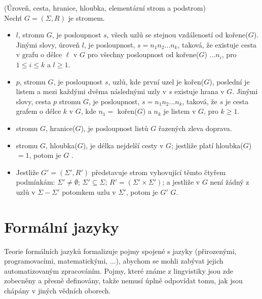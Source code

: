 \begin{defn}
  (Úroveň, cesta, hranice, hloubka, elementární strom a podstrom)\\
  Nechť $G = (\Sigma, R)$ je stromem.
  \begin{itemize}
    \item {} $l$, stromu $G$, je posloupnost $s$,
      všech uzlů se stejnou vzdáleností od kořene($G$).
      Jinými slovy, úroveň $l$, je posloupnost, $s = n_1 n_2 ... n_k$,
      taková, že existuje cesta v grafu o délce $\ell$ v $G$
      pro všechny posloupnost od kořene($G$)
      $ ... n_i$, pro $1 \leq i \leq k$ a $l \geq 1$.

    \item {} $p$, stromu $G$, je posloupnost $s$, uzlů,
      kde první uzel je kořen($G$), poslední je listem a mezi každými
      dvěma následnými uzly v $s$ existuje hrana v $G$.
      Jinými slovy, cesta $p$ stromu $G$, je posloupnost,
      $s = n_1 n_2 ... n_k$, taková, že $s$ je cesta grafem
      o délce $k$ v $G$, kde $n_1 =$ kořen($G$) a $n_k$ je listem
      v $G$, pro $k \geq 1$.

    \item {} stromu $G$, hranice($G$),
      je posloupnost listů $G$ řazených zleva doprava.

    \item {} stromu $G$, hloubka($G$), je délka nejdelší cesty v $G$;
      jestliže platí hloubka($G$)$ = 1$, potom je $G$ .

    \item Jestliže $G' = (\Sigma', R')$ představuje strom vyhovující těmto
      čtyřem podmínkám:
      $\Sigma' \neq \emptyset$;
      $\Sigma' \subseteq \Sigma$;
      $R' = (\Sigma' \times \Sigma')$;
      a jestliže v $G$ není žádný z uzlů v $\Sigma - \Sigma'$ potomkem
      uzlu v $\Sigma'$, potom je $G'$  $G$.
  \end{itemize}
  \vspace{-0.5cm}
\end{defn}

\chapter{Formální jazyky}
\label{chap:FormalLangs}

Teorie formálních jazyků formalizuje pojmy spojené s jazyky
(přirozenými, programovacími, matematickými, ...), abychom se mohli zabývat
jejich automatizovaným zpracováním.
Pojmy, které známe z lingvistiky jsou zde zobecněny a přesně definovány,
takže nemusí úplně odpovídat tomu, jak jsou chápány v jiných vědních oborech.

